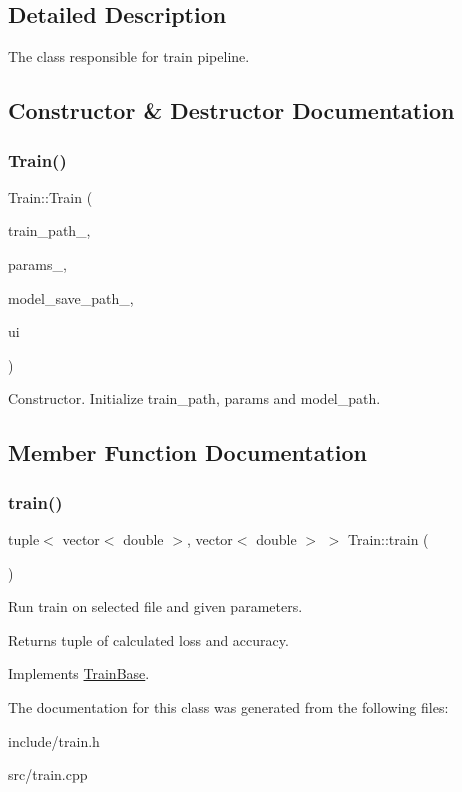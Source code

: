 \subsection{Detailed Description}
The class responsible for train pipeline. 

\subsection{Constructor \& Destructor Documentation}
\mbox{\label{classTrain_a4b75a671b226dea5fb805ae78861bf57}} 
\subsubsection{\texorpdfstring{Train()}{Train()}}
{\footnotesize\ttfamily Train\+::\+Train (\begin{DoxyParamCaption}\item[{string}]{train\+\_\+path\+\_\+,  }\item[{const \hyperlink{structTrainParameters}{Train\+Parameters} \&}]{params\+\_\+,  }\item[{string}]{model\+\_\+save\+\_\+path\+\_\+,  }\item[{\hyperlink{classUi__Train__Window}{Ui\+\_\+\+Train\+\_\+\+Window} $\ast$}]{ui }\end{DoxyParamCaption})\hspace{0.3cm}{\ttfamily [explicit]}}

Constructor. Initialize train\+\_\+path, params and model\+\_\+path. 

\subsection{Member Function Documentation}
\mbox{\label{classTrain_af7a62fd09c8ea99ca0dac16cc5d1742f}} 
\subsubsection{\texorpdfstring{train()}{train()}}
{\footnotesize\ttfamily tuple$<$ vector$<$ double $>$, vector$<$ double $>$ $>$ Train\+::train (\begin{DoxyParamCaption}{ }\end{DoxyParamCaption})\hspace{0.3cm}{\ttfamily [virtual]}}

Run train on selected file and given parameters. \begin{DoxyReturn}{Returns}
tuple of calculated loss and accuracy. 
\end{DoxyReturn}


Implements \hyperlink{classTrainBase}{Train\+Base}.



The documentation for this class was generated from the following files\+:\begin{DoxyCompactItemize}
\item 
include/train.\+h\item 
src/train.\+cpp\end{DoxyCompactItemize}

